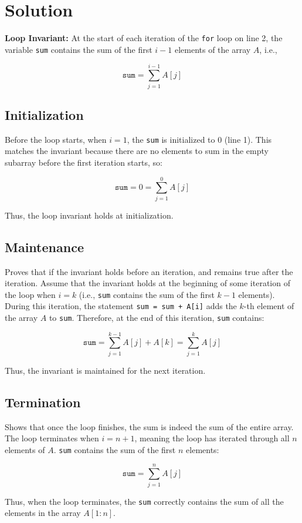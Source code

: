 \documentclass{article}
\begin{document}
\section*{Solution}

\textbf{Loop Invariant:} At the start of each iteration of the \texttt{for} loop on line 2, the variable \texttt{sum} contains the sum of the first $i-1$ elements of the array $A$, i.e., 

\[
\texttt{sum} = \sum_{j=1}^{i-1} A[j]
\]

\subsection*{Initialization}
Before the loop starts, when $i = 1$, the \texttt{sum} is initialized to 0 (line 1). This matches the invariant because there are no elements to sum in the empty subarray before the first iteration starts, so:

\[
\texttt{sum} = 0 = \sum_{j=1}^{0} A[j]
\]

Thus, the loop invariant holds at initialization.

\subsection*{Maintenance}
Proves that if the invariant holds before an iteration, and remains true after the iteration. Assume that the invariant holds at the beginning of some iteration of the loop when $i = k$ (i.e., \texttt{sum} contains the sum of the first $k-1$ elements). During this iteration, the statement \texttt{sum = sum + A[i]} adds the $k$-th element of the array $A$ to \texttt{sum}. Therefore, at the end of this iteration, \texttt{sum} contains:

\[
\texttt{sum} = \sum_{j=1}^{k-1} A[j] + A[k] = \sum_{j=1}^{k} A[j]
\]

Thus, the invariant is maintained for the next iteration.

\subsection*{Termination}
Shows that once the loop finishes, the sum is indeed the sum of the entire array. The loop terminates when $i = n + 1$, meaning the loop has iterated through all $n$ elements of $A$. \texttt{sum} contains the sum of the first $n$ elements:

\[
\texttt{sum} = \sum_{j=1}^{n} A[j]
\]

Thus, when the loop terminates, the \texttt{sum} correctly contains the sum of all the elements in the array $A[1:n]$.
\end{document}

